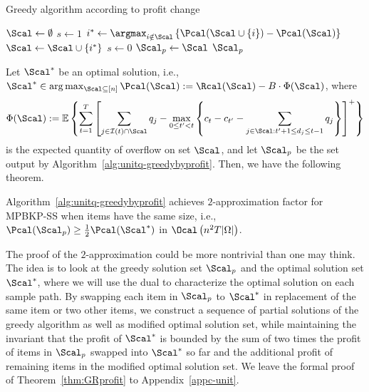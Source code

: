 \documentclass[11pt]{article}
\begin{document}
\begin{algorithm}[h]
	\footnotesize
	\caption{Greedy algorithm according to profit change}
	\label{alg:unitq-greedybyprofit}
	\begin{algorithmic}[1]
		\State $\Scal\gets \emptyset$
		\State $s\gets 1$
		\State $i^*\gets \argmax_{i \notin\Scal}\left\{\Pcal(\Scal\cup\{i\})-\Pcal(\Scal)\right\}$
		\State $\Scal\gets \Scal\cup\{i^*\}$
		\Else 
		\State $s\gets 0$
		\EndIf
		\EndWhile
		\State $\Scal_{p}\gets \Scal$
		 $\Scal_p$
	\end{algorithmic}
\end{algorithm}

Let $\Scal^*$ be an optimal solution, i.e.,
$\Scal^* \in \arg\max_{\Scal\subseteq [n]} \Pcal(\Scal) := \Rcal(\Scal) - B\cdot \Phi(\Scal)$,
where $$\Phi(\Scal) := \mathbb{E}\left\{\sum_{t=1}^T\left[\sum_{j\in \mathcal{I}(t)\cap\Scal}q_j-\max_{0\leq t' < t}\left\{ c_t - c_{t'}-\sum_{j  \in \Scal : t'+1 \leq d_j \leq t-1} q_j\right\}\right]^+ \right\}$$ is the expected quantity of overflow on set $\Scal$, and let $\Scal_p$ be the set output by Algorithm~\ref{alg:unitq-greedybyprofit}.
Then, we have the following theorem. 
\begin{theorem}\label{thm:GRprofit}
	Algorithm~\ref{alg:unitq-greedybyprofit} achieves $2$-approximation factor for MPBKP-SS when items have the same size, i.e., $\Pcal(\Scal_p) \ge \frac{1}{2}\Pcal(\Scal^*)$  in $\Ocal\left(n^2T|\Omega|\right)$.
\end{theorem}

The proof of the $2$-approximation could be more nontrivial than one may think. The idea is to look at the greedy solution set $\Scal_p$ and the optimal solution set $\Scal^*$,  where we will use the dual to characterize the optimal solution on each sample path. By swapping each item in $\Scal_p$ to $\Scal^*$ in replacement of the same item or two other items, we construct a sequence of partial solutions of the greedy algorithm as well as modified optimal solution set, while maintaining the invariant that the profit of $\Scal^*$ is bounded by the sum of two times the profit of items in $\Scal_p$ swapped into $\Scal^*$ so far and the additional profit of remaining items in the modified optimal solution set. We leave the formal proof of Theorem~\ref{thm:GRprofit} to Appendix~\ref{appc-unit}.
\end{document}
